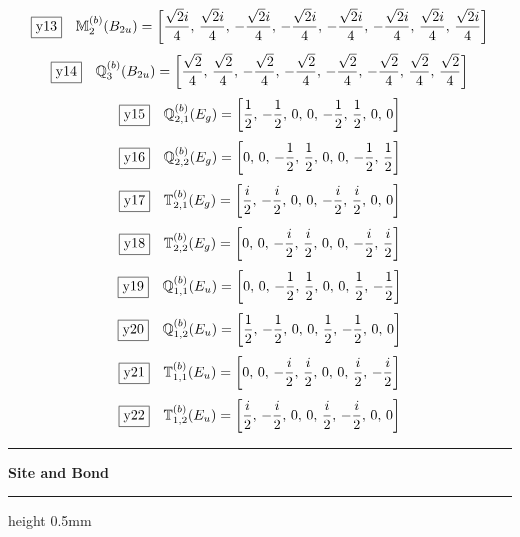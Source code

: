 \documentclass[fleqn,10pt,landscape]{jsarticle}
\begin{document}
\begin{dmath*}
\fbox{y13}\quad \mathbb{M}_{2}^{(b)}(B_{2u})=\left[ \frac{\sqrt{2} i}{4},\, \frac{\sqrt{2} i}{4},\, - \frac{\sqrt{2} i}{4},\, - \frac{\sqrt{2} i}{4},\, - \frac{\sqrt{2} i}{4},\, - \frac{\sqrt{2} i}{4},\, \frac{\sqrt{2} i}{4},\, \frac{\sqrt{2} i}{4} \right]
\end{dmath*}
\begin{dmath*}
\fbox{y14}\quad \mathbb{Q}_{3}^{(b)}(B_{2u})=\left[ \frac{\sqrt{2}}{4},\, \frac{\sqrt{2}}{4},\, - \frac{\sqrt{2}}{4},\, - \frac{\sqrt{2}}{4},\, - \frac{\sqrt{2}}{4},\, - \frac{\sqrt{2}}{4},\, \frac{\sqrt{2}}{4},\, \frac{\sqrt{2}}{4} \right]
\end{dmath*}
\begin{dmath*}
\fbox{y15}\quad \mathbb{Q}_{2,1}^{(b)}(E_{g})=\left[ \frac{1}{2},\, - \frac{1}{2},\, 0,\, 0,\, - \frac{1}{2},\, \frac{1}{2},\, 0,\, 0 \right]
\end{dmath*}
\begin{dmath*}
\fbox{y16}\quad \mathbb{Q}_{2,2}^{(b)}(E_{g})=\left[ 0,\, 0,\, - \frac{1}{2},\, \frac{1}{2},\, 0,\, 0,\, - \frac{1}{2},\, \frac{1}{2} \right]
\end{dmath*}
\begin{dmath*}
\fbox{y17}\quad \mathbb{T}_{2,1}^{(b)}(E_{g})=\left[ \frac{i}{2},\, - \frac{i}{2},\, 0,\, 0,\, - \frac{i}{2},\, \frac{i}{2},\, 0,\, 0 \right]
\end{dmath*}
\begin{dmath*}
\fbox{y18}\quad \mathbb{T}_{2,2}^{(b)}(E_{g})=\left[ 0,\, 0,\, - \frac{i}{2},\, \frac{i}{2},\, 0,\, 0,\, - \frac{i}{2},\, \frac{i}{2} \right]
\end{dmath*}
\begin{dmath*}
\fbox{y19}\quad \mathbb{Q}_{1,1}^{(b)}(E_{u})=\left[ 0,\, 0,\, - \frac{1}{2},\, \frac{1}{2},\, 0,\, 0,\, \frac{1}{2},\, - \frac{1}{2} \right]
\end{dmath*}
\begin{dmath*}
\fbox{y20}\quad \mathbb{Q}_{1,2}^{(b)}(E_{u})=\left[ \frac{1}{2},\, - \frac{1}{2},\, 0,\, 0,\, \frac{1}{2},\, - \frac{1}{2},\, 0,\, 0 \right]
\end{dmath*}
\begin{dmath*}
\fbox{y21}\quad \mathbb{T}_{1,1}^{(b)}(E_{u})=\left[ 0,\, 0,\, - \frac{i}{2},\, \frac{i}{2},\, 0,\, 0,\, \frac{i}{2},\, - \frac{i}{2} \right]
\end{dmath*}
\begin{dmath*}
\fbox{y22}\quad \mathbb{T}_{1,2}^{(b)}(E_{u})=\left[ \frac{i}{2},\, - \frac{i}{2},\, 0,\, 0,\, \frac{i}{2},\, - \frac{i}{2},\, 0,\, 0 \right]
\end{dmath*}
\vspace{5mm}
\noindent \rule[0.5mm]{5mm}{0.5mm}\hspace{3mm}\textbf{Site and Bond}\hspace{3mm}\leaders\hrule height 0.5mm\hfill\kern0pt
\vspace{3mm}
\end{document}
